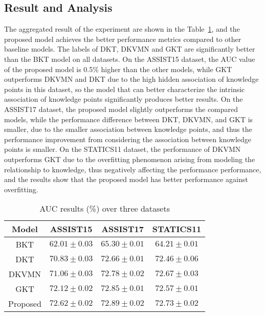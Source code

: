 \subsection{Result and Analysis}

The aggregated result of the experiment are shown in the Table~\ref{tbl:ch3-tb2}, and the proposed model achieves the better performance metrics compared to other baseline models. The labels of DKT, DKVMN and GKT are significantly better than the BKT model on all datasets. On the ASSIST15 dataset, the AUC value of the proposed model is 0.5\% higher than the other models, while GKT outperforms DKVMN and DKT due to the high hidden association of knowledge points in this dataset, so the model that can better characterize the intrinsic association of knowledge points significantly produces better results. On the ASSIST17 dataset, the proposed model slightly outperforms the compared models, while the performance difference between DKT, DKVMN, and GKT is smaller, due to the smaller association between knowledge points, and thus the performance improvement from considering the association between knowledge points is smaller. On the STATICS11 dataset, the performance of DKVMN outperforms GKT due to the overfitting phenomenon arising from modeling the relationship to knowledge, thus negatively affecting the performance performance, and the results show that the proposed model has better performance against overfitting.

\begin{table}[h]
	\centering
	\caption{AUC results (\%) over three datasets}\label{tbl:ch3-tb2}
	\begin{tabular}{cccc}
		\toprule
		Model    & ASSIST15                    & ASSIST17                   & STATICS11                  \\
		\midrule
		BKT      & \(62.01\pm 0.03 \)          & \(65.30\pm 0.01\)          & \(64.21\pm 0.01\)          \\
		DKT      & \(70.83\pm 0.03 \)          & \(72.66\pm 0.01\)          & \(72.46\pm 0.06\)          \\
		DKVMN    & \(71.06\pm 0.03 \)          & \(72.78\pm 0.02\)          & \(72.67\pm 0.03\)          \\
		GKT      & \(72.12\pm 0.02 \)          & \(72.85\pm 0.01\)          & \(72.57\pm 0.01\)          \\
		\midrule
		Proposed & \(\mathbf{72.62\pm 0.02} \) & \(\mathbf{72.89\pm 0.02}\) & \(\mathbf{72.73\pm 0.02}\) \\
		\bottomrule
	\end{tabular}
\end{table}
